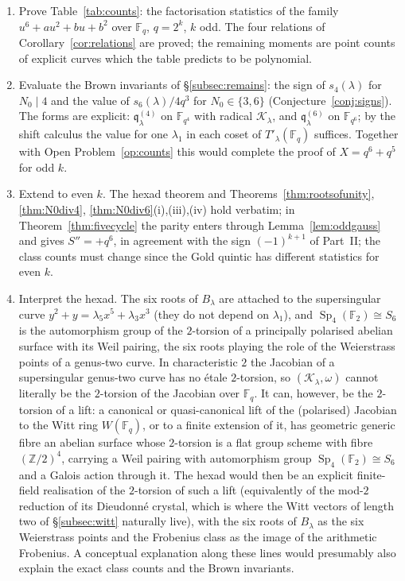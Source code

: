 \documentclass[12pt,a4paper]{amsart}
\theoremstyle{definition}
\newcommand{\F}{\mathbb{F}}
\newcommand{\Z}{\mathbb{Z}}
\newcommand{\Sp}{\operatorname{Sp}}
\newcommand{\Kk}{\mathcal{K}}
\newcommand{\qq}{\mathfrak{q}}
\newcommand{\Spp}{S''}
\begin{document}
\begin{enumerate}[label=\textbf{Open Problem \arabic*.},ref=\arabic*,wide,labelindent=0pt,itemsep=0.8ex]
\item\label{op:counts} Prove Table~\ref{tab:counts}: the factorisation statistics of the family $u^6+au^2+bu+b^2$ over $\F_q$, $q=2^k$, $k$ odd. The four relations of Corollary~\ref{cor:relations} are proved; the remaining moments are point counts of explicit curves which the table predicts to be polynomial.
\item\label{op:brown} Evaluate the Brown invariants of \S\ref{subsec:remains}: the sign of $s_4(\lambda)$ for $N_0\mid4$ and the value of $s_6(\lambda)/4q^3$ for $N_0\in\{3,6\}$ (Conjecture~\ref{conj:signs}). The forms are explicit: $\qq^{(4)}_\lambda$ on $\F_{q^4}$ with radical $\Kk_\lambda$, and $\qq^{(6)}_\lambda$ on $\F_{q^6}$; by the shift calculus the value for one $\lambda_1$ in each coset of $T'_\lambda(\F_q)$ suffices. Together with Open Problem~\ref{op:counts} this would complete the proof of $X=q^6+q^5$ for odd $k$.
\item Extend to even $k$. The hexad theorem and Theorems~\ref{thm:rootsofunity}, \ref{thm:N0div4}, \ref{thm:N0div6}(i),(iii),(iv) hold verbatim; in Theorem~\ref{thm:fivecycle} the parity enters through Lemma~\ref{lem:oddgauss} and gives $\Spp=+q^6$, in agreement with the sign $(-1)^{k+1}$ of Part~II; the class counts must change since the Gold quintic has different statistics for even $k$.
\item Interpret the hexad. The six roots of $B_\lambda$ are attached to the supersingular curve $y^2+y=\lambda_5x^5+\lambda_3x^3$ (they do not depend on $\lambda_1$), and $\Sp_4(\F_2)\cong S_6$ is the automorphism group of the $2$-torsion of a principally polarised abelian surface with its Weil pairing, the six roots playing the role of the Weierstrass points of a genus-two curve. In characteristic $2$ the Jacobian of a supersingular genus-two curve has no \'etale $2$-torsion, so $(\Kk_\lambda,\omega)$ cannot literally be the $2$-torsion of the Jacobian over $\F_q$. It can, however, be the $2$-torsion of a lift: a canonical or quasi-canonical lift of the (polarised) Jacobian to the Witt ring $W(\F_q)$, or to a finite extension of it, has geometric generic fibre an abelian surface whose $2$-torsion is a flat group scheme with fibre $(\Z/2)^4$, carrying a Weil pairing with automorphism group $\Sp_4(\F_2)\cong S_6$ and a Galois action through it. The hexad would then be an explicit finite-field realisation of the $2$-torsion of such a lift (equivalently of the mod-$2$ reduction of its Dieudonn\'e crystal, which is where the Witt vectors of length two of \S\ref{subsec:witt} naturally live), with the six roots of $B_\lambda$ as the six Weierstrass points and the Frobenius class as the image of the arithmetic Frobenius. A conceptual explanation along these lines would presumably also explain the exact class counts and the Brown invariants.

\end{enumerate}
\end{document}

